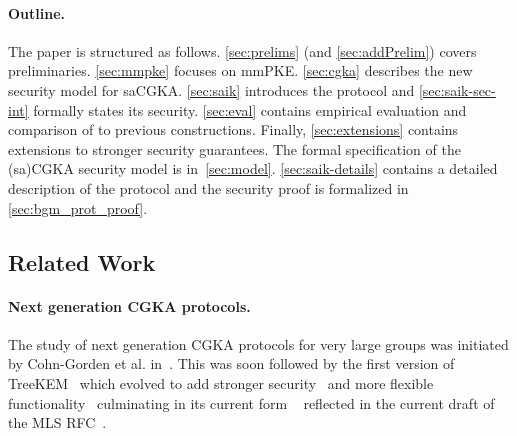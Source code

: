 
\paragraph{Outline.}
The paper is structured as follows. \cref{sec:prelims}
(and \cref{sec:addPrelim}) covers preliminaries. \cref{sec:mmpke}
focuses on mmPKE. \cref{sec:cgka} describes the new security model for
saCGKA. \cref{sec:saik} introduces the \saik protocol and \cref{sec:saik-sec-int} formally states its security. \cref{sec:eval} contains empirical
evaluation and comparison of \saik to previous constructions. Finally, \cref{sec:extensions} contains extensions
to stronger security guarantees.
The formal specification of the (sa)CGKA security
model is in~\cref{sec:model}. \cref{sec:saik-details} contains a detailed description of the \saik protocol and the
security proof is formalized in \cref{sec:bgm_prot_proof}.



\subsection{Related Work}

\paragraph{Next generation CGKA protocols.}
The study of next generation CGKA protocols for very large groups was
initiated by Cohn-Gorden et al. in~\cite{CCS:CCGMM18}. This was soon followed
by the first version of TreeKEM~\cite{TreeKEM-original-email} which
evolved to add stronger
security~\cite{TreeKEM-original-email,TreeKEM-with-blanking-email,TreeKEM-tree-signing-email}
and more flexible functionality~\cite{TreeKEM-prop-and-comm-email}
culminating in its current form \protITK{}~\cite{EPRINT:AlwJosMul20}
reflected in the current draft of the MLS RFC~\cite{mls-protocol-latest}.

